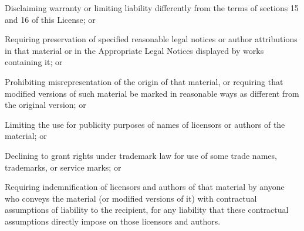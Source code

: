 \documentclass{article}
\begin{document}
\begin{characters}

\item[Disclaiming] warranty or limiting liability differently from the terms of sections 15 and 16 of this License; or

\item[Requiring] preservation of specified reasonable legal notices or author attributions in that material or in the Appropriate Legal Notices displayed by works containing it; or

\item[Prohibiting] misrepresentation of the origin of that material, or requiring that modified versions of such material be marked in reasonable ways as different from the original version; or

\item[Limiting] the use for publicity purposes of names of licensors or authors of the material; or

\item[Declining] to grant rights under trademark law for use of some trade names, trademarks, or service marks; or

\item[Requiring] indemnification of licensors and authors of that material by anyone who conveys the material (or modified versions of it) with contractual assumptions of liability to the recipient, for any liability that these contractual assumptions directly impose on those licensors and authors.

\end{characters}
\end{document}
